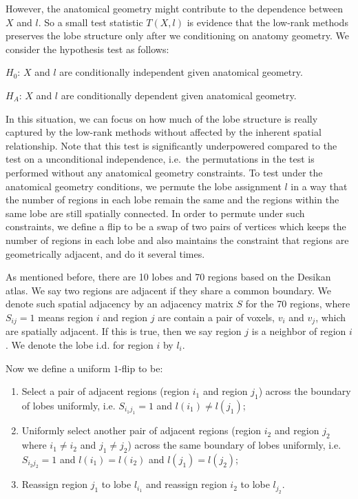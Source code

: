 However, the anatomical geometry might contribute to the dependence between $X$ and $l$. So a small test statistic $T(X, l)$ is evidence that the low-rank methods preserves the lobe structure only after we conditioning on anatomy geometry. We consider the hypothesis test as follows:

$H_0$: $X$ and $l$ are conditionally independent given anatomical geometry.

$H_A$: $X$ and $l$ are conditionally dependent given anatomical geometry.

In this situation, we can focus on how much of the lobe structure is really captured by the low-rank methods without affected by the inherent spatial relationship. Note that this test is significantly underpowered compared to the test on a unconditional independence, i.e.\ the permutations in the test is performed without any anatomical geometry constraints.
To test under the anatomical geometry conditions, we permute the lobe assignment $l$ in a way that the number of regions in each lobe remain the same and the regions within the same lobe are still spatially connected. In order to permute under such constraints, we define a flip to be a swap of two pairs of vertices which keeps the number of regions in each lobe and also maintains the constraint that regions are geometrically adjacent, and do it several times.

As mentioned before, there are 10 lobes and 70 regions based on the Desikan atlas. 
We say two regions are adjacent if they share a common boundary. We denote such spatial adjacency by an adjacency matrix $S$ for the 70 regions, where $S_{ij} = 1$ means region $i$ and region $j$ are contain a pair of voxels, $v_i$ and $v_j$, which are spatially adjacent.
If this is true, then we say region $j$ is a neighbor of region $i$.
We denote the lobe i.d. for region $i$ by $l_i$.

Now we define a uniform $1$-flip to be:
\begin{enumerate}
\item Select a pair of adjacent regions (region $i_1$ and region $j_1$) across the boundary of lobes uniformly, i.e. $S_{i_1 j_1} = 1$ and $l(i_1) \ne l(j_1)$;
\item Uniformly select another pair of adjacent regions (region $i_2$ and region $j_2$ where $i_1 \ne i_2$ and $j_1 \ne j_2$) across the same boundary of lobes uniformly, i.e. $S_{i_2 j_2} = 1$ and $l(i_1) = l(i_2)$ and $l(j_1) = l(j_2)$;
\item Reassign region $j_1$ to lobe $l_{i_1}$ and reassign region $i_2$ to lobe $l_{j_2}$.
\end{enumerate}

